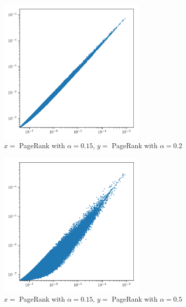 \documentclass{article}
\begin{document}
\begin{figure}[H]
    \centering
    \includegraphics[width=0.65\textwidth]{plots/4.png}
    \caption{$x =$ PageRank with $\alpha = 0.15$, $y = $ PageRank with $\alpha = 0.2$}
    \label{fig:4}
\end{figure}

\begin{figure}[H]
    \centering
    \includegraphics[width=0.65\textwidth]{plots/5.png}
    \caption{$x =$ PageRank with $\alpha = 0.15$, $y = $ PageRank with $\alpha = 0.5$}
    \label{fig:5}
\end{figure}
\end{document}
